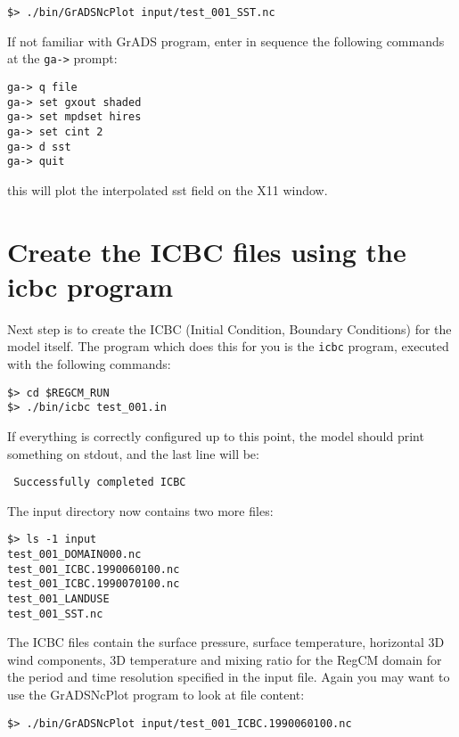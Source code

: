 \begin{Verbatim}
$> ./bin/GrADSNcPlot input/test_001_SST.nc
\end{Verbatim}

If not familiar with GrADS program, enter in sequence the following commands at
the \verb=ga->= prompt:

\begin{Verbatim}
ga-> q file
ga-> set gxout shaded
ga-> set mpdset hires
ga-> set cint 2
ga-> d sst
ga-> quit
\end{Verbatim}

this will plot the interpolated sst field on the X11 window.

\section{Create the ICBC files using the icbc program}

Next step is to create the ICBC (Initial Condition, Boundary Conditions) for
the model itself. The program which does this for you is the \verb=icbc=
program, executed with the following commands:

\begin{Verbatim}
$> cd $REGCM_RUN
$> ./bin/icbc test_001.in
\end{Verbatim}

If everything is correctly configured up to this point, the model should print
something on stdout, and the last line will be:

\begin{Verbatim}
 Successfully completed ICBC
\end{Verbatim}

The input directory now contains two more files:

\begin{Verbatim}
$> ls -1 input
test_001_DOMAIN000.nc
test_001_ICBC.1990060100.nc
test_001_ICBC.1990070100.nc
test_001_LANDUSE
test_001_SST.nc
\end{Verbatim}

The ICBC files contain the surface pressure, surface temperature, horizontal
3D wind components, 3D temperature and mixing ratio for the RegCM domain for the
period and time resolution specified in the input file.
Again you may want to use the GrADSNcPlot program to look at file content:

\begin{Verbatim}
$> ./bin/GrADSNcPlot input/test_001_ICBC.1990060100.nc
\end{Verbatim}

